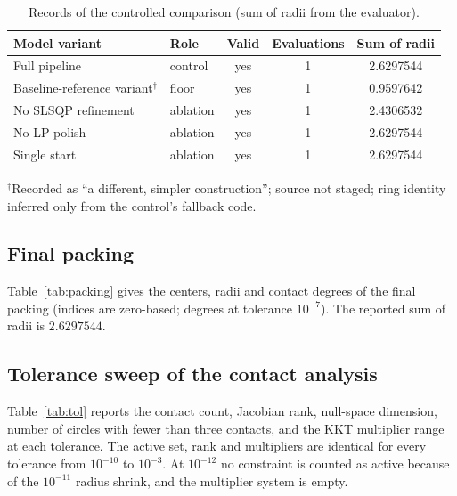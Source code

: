 \documentclass{article} %
\begin{document}
\begin{table}[h]
\centering
\caption{Records of the controlled comparison (sum of radii from the evaluator).}
\label{tab:records}
\small
\begin{tabular}{llccc}
\toprule
Model variant & Role & Valid & Evaluations & Sum of radii \\
\midrule
Full pipeline & control & yes & 1 & 2.6297544 \\
Baseline-reference variant$^\dagger$ & floor & yes & 1 & 0.9597642 \\
No SLSQP refinement & ablation & yes & 1 & 2.4306532 \\
No LP polish & ablation & yes & 1 & 2.6297544 \\
Single start & ablation & yes & 1 & 2.6297544 \\
\bottomrule
\end{tabular}

\smallskip
\raggedright\footnotesize $^\dagger$Recorded as ``a different, simpler construction''; source not staged; ring identity inferred only from the control's fallback code.
\end{table}

\subsection{Final packing}
Table~\ref{tab:packing} gives the centers, radii and contact degrees of the final packing (indices are zero-based; degrees at tolerance $10^{-7}$). The reported sum of radii is $2.6297544$.

\begin{table}[h]
\centering
\caption{Final packing: centers, radii, and total contact degree (circle plus wall contacts).}
\label{tab:packing}
\footnotesize
\setlength{\tabcolsep}{4pt}

\end{table}

\subsection{Tolerance sweep of the contact analysis}
Table~\ref{tab:tol} reports the contact count, Jacobian rank, null-space dimension, number of circles with fewer than three contacts, and the KKT multiplier range at each tolerance. The active set, rank and multipliers are identical for every tolerance from $10^{-10}$ to $10^{-3}$. At $10^{-12}$ no constraint is counted as active because of the $10^{-11}$ radius shrink, and the multiplier system is empty.
\end{document}
